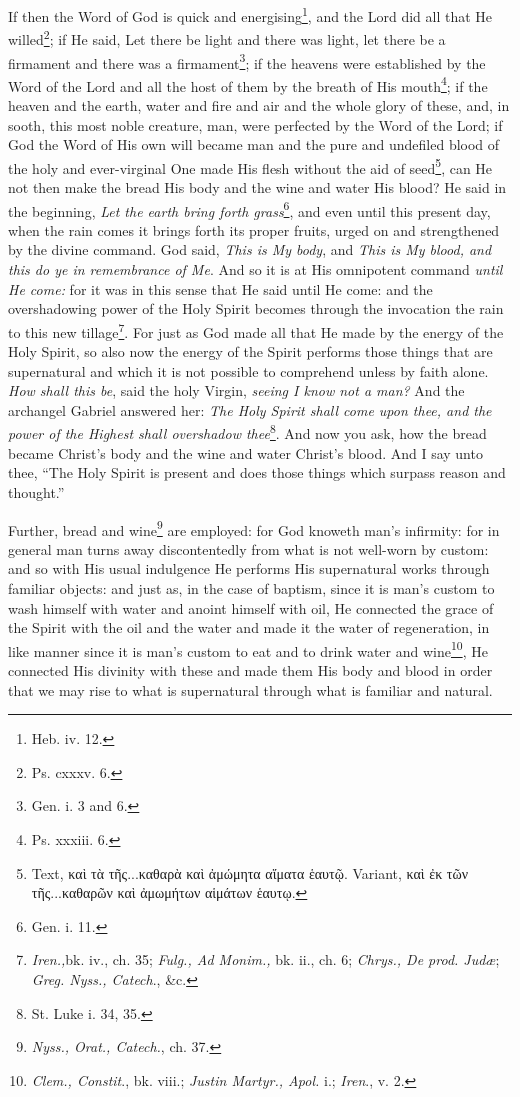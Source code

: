 If then the Word of God is quick and energising\footnote{Heb. iv. 12.}, and the Lord did all that He willed\footnote{Ps. cxxxv. 6.}; if He said, Let there be light and there was light, let there be a firmament and there was a firmament\footnote{Gen. i. 3 and 6.}; if the heavens were established by the Word of the Lord and all the host of them by the breath of His mouth\footnote{Ps. xxxiii. 6.}; if the heaven and the earth, water and fire and air and the whole glory of these, and, in sooth, this most noble creature, man, were perfected by the Word of the Lord; if God the Word of His own will became man and the pure and undefiled blood of the holy and ever-virginal One made His flesh without the aid of seed\footnote{Text, \textgreek{καὶ τὰ τῆς...καθαρὰ καὶ ἀμώμητα αἵματα ἑαυτῷ}. Variant, \textgreek{καὶ ἐκ τῶν τῆς...καθαρῶν καὶ ἀμωμήτων αἱμάτων ἑαυτῳ}.}, can He not then make the bread His body and the wine and water His blood? He said in the beginning, \emph{Let the earth bring forth grass}\footnote{Gen. i. 11.}, and even until this present day, when the rain comes it brings forth its proper fruits, urged on and strengthened by the divine command. God said, \emph{This is My body}, and \emph{This is My blood, and this do ye in remembrance of Me}. And so it is at His omnipotent command \emph{until He come: }for it was in this sense that He said until He come: and the overshadowing power of the Holy Spirit becomes through the invocation the rain to this new tillage\footnote{\emph{Iren.,}bk. iv., ch. 35; \emph{Fulg., Ad Monim., }bk. ii., ch. 6; \emph{Chrys., De prod. Judæ}; \emph{Greg. Nyss., Catech}., \&c.}. For just as God made all that He made by the energy of the Holy Spirit, so also now the energy of the Spirit performs those things that are supernatural and which it is not possible to comprehend unless by faith alone. \emph{How shall this be}, said the holy Virgin, \emph{seeing I know not a man? }And the archangel Gabriel answered her: \emph{The Holy Spirit shall come upon thee, and the power of the Highest shall overshadow thee}\footnote{St. Luke i. 34, 35.}. And now you ask, how the bread became Christ’s body and the wine and water Christ’s blood. And I say unto thee, “The Holy Spirit is present and does those things which surpass reason and thought.”

Further, bread and wine\footnote{\emph{Nyss., Orat., Catech.}, ch. 37.} are employed: for God knoweth man’s infirmity: for in general man turns away discontentedly from what is not well-worn by custom: and so with His usual indulgence He performs His supernatural works through familiar objects: and just as, in the case of baptism, since it is man’s custom to wash himself with water and anoint himself with oil, He connected the grace of the Spirit with the oil and the water and made it the water of regeneration, in like manner since it is man’s custom to eat and to drink water and wine\footnote{\emph{Clem., Constit}., bk. viii.; \emph{Justin Martyr., Apol. }i.; \emph{Iren}., v. 2.}, He connected His divinity with these and made them His body and blood in order that we may rise to what is supernatural through what is familiar and natural.

